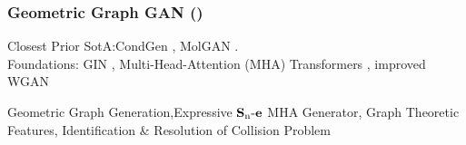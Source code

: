 \documentclass[./presentation.tex]{subfiles}
\begin{document}
\begin{frame}[t,label=gggintro]
  \frametitle{Geometric Graph GAN (\cite{krawczukGGGANGeometricGraph2020})}
  \vspace{-1cm}
  \small
  \begin{priorart}
  Closest Prior SotA:CondGen \citep{yangConditionalStructureGeneration2019e}, MolGAN \citep{decaoMolGANImplicitGenerative2022b}.\\
   Foundations: GIN \citep{xuHowPowerfulAre2019e}, Multi-Head-Attention (MHA) Transformers \citep{vaswaniAttentionAllYou2017c}, improved WGAN \citep{gulrajaniImprovedTrainingWasserstein2017d}
  \end{priorart}
  \begin{contributions}
    Geometric Graph Generation,Expressive $\operatorname{\mathbf{S}_n\mathbf{-e}}$ MHA Generator, Graph Theoretic Features, Identification \& Resolution of Collision Problem
  \end{contributions}
  \begin{columns}
    \begin{column}{0.5\textwidth}
      \begin{outcomes}
      \end{outcomes}
    \end{column}
    \begin{column}{0.5\textwidth}
      \begin{impact} 
      \end{impact} 
    \end{column}
  \end{columns}
\end{frame}
\end{document}
